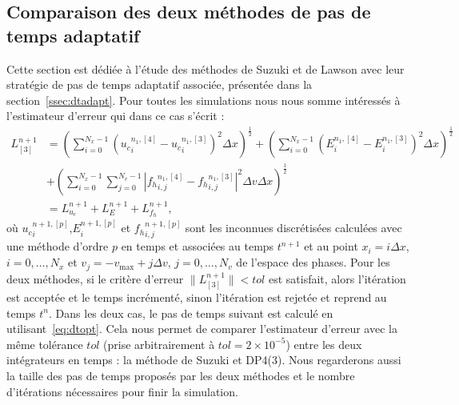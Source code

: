 \FloatBarrier

\subsection{Comparaison des deux méthodes de pas de temps adaptatif}
\label{ssec:2:dtn}

Cette section est dédiée à l'étude des méthodes de Suzuki et de Lawson avec leur stratégie de pas de temps adaptatif associée, présentée dans la section~\ref{ssec:dtadapt}. Pour toutes les simulations nous nous somme intéressés à l'estimateur d'erreur qui dans ce cas s'écrit :
\begin{equation}
  \begin{aligned}
    L^{n+1}_{[3]} & = \left(\sum_{i=0}^{N_x-1}\left( {u_c}_i^{n_1,[4]}-{u_c}_i^{n_1,[3]} \right)^2\Delta x\right)^{\frac{1}{2}}
                    + \left(\sum_{i=0}^{N_x-1}\left( {E}_i^{n_1,[4]}-{E}_i^{n_1,[3]} \right)^2\Delta x\right)^{\frac{1}{2}} \\
                  & + \left(\sum_{i=0}^{N_x-1}\sum_{j=0}^{N_v-1}\left| {f_h}_{i,j}^{n_1,[4]}-{f_h}_{i,j}^{n_1,[3]} \right|^2\Delta v\Delta x\right)^{\frac{1}{2}} \\
                  & = L_{u_c}^{n+1} + L_{E}^{n+1} + L_{f_h}^{n+1},
  \end{aligned}
  \label{eq:LucEfh:localerror}
\end{equation}
où ${u_c}_i^{n+1,[p]}$,${E}_i^{n+1,[p]}$ et ${f_h}_{i,j}^{n+1,[p]}$ sont les inconnues discrétisées calculées avec une méthode d'ordre $p$ en temps et associées au temps $t^{n+1}$ et au point $x_i=i\Delta x$, $i=0,\dots,N_x$ et $v_j = -v_\text{max} + j\Delta v$, $j=0,\dots,N_v$ de l'espace des phases. Pour les deux méthodes, si le critère d'erreur $\|L_{[3]}^{n+1}\|<tol$ est satisfait, alors l'itération est acceptée et le temps incrémenté, sinon l'itération est rejetée et reprend au temps $t^n$. Dans les deux cas, le pas de temps suivant est calculé en utilisant~\eqref{eq:dtopt}. Cela nous permet de comparer l'estimateur d'erreur avec la même tolérance $tol$ (prise arbitrairement à $tol=2\times10^{-5}$) entre les deux intégrateurs en temps : la méthode de Suzuki et DP4(3). Nous regarderons aussi la taille des pas de temps proposés par les deux méthodes et le nombre d'itérations nécessaires pour finir la simulation.

